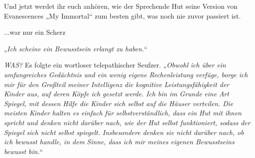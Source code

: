 
\begin{chapterOpeningAuthorNote}
% 
Und jetzt werdet ihr euch anhören, wie der Sprechende Hut seine Version von Evanescences „My Immortal“ zum besten gibt, was noch nie zuvor passiert ist.

...war nur ein Scherz
\end{chapterOpeningAuthorNote}


\hplettrineextrapara
„\emph{Ich scheine ein Bewusstsein erlangt zu haben.}“

\emph{WAS?}
Es folgte ein wortloser telepathischer Seufzer. „\emph{Obwohl ich über ein umfangreiches Gedächtnis und ein wenig eigene Rechenleistung verfüge, borge ich mir für den Großteil meiner Intelligenz die kognitive Leistungsfähigkeit der Kinder aus, auf deren Köpfe ich gesetzt werde. Ich bin im Grunde eine Art Spiegel, mit dessen Hilfe die Kinder \emph{sich selbst} auf die Häuser verteilen. Die meisten Kinder halten es einfach für selbstverständlich, dass ein Hut mit ihnen spricht und denken nicht darüber nach, wie der Hut \emph{selbst} funktioniert, sodass der Spiegel sich nicht selbst spiegelt. \emph{Insbesondere} denken sie nicht darüber nach, ob ich bewusst handle, in dem Sinne, dass ich mir meines eigenen Bewusstseins bewusst bin.}“

